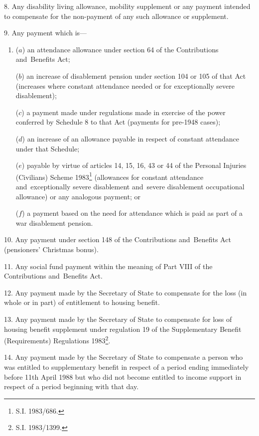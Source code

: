 \documentclass[12pt,a4paper]{article}
\begin{document}
8.  Any disability living allowance, mobility supplement or any payment intended to compensate for the non-payment of any such allowance or supplement.

\medskip

9.  Any payment which is—
\begin{enumerate}\item[]
($a$) an attendance allowance under section 64 of the Contributions and~Benefits Act;

($b$) an increase of disablement pension under section 104 or 105 of that Act (increases where constant attendance needed or for exceptionally severe disablement);

($c$) a payment made under regulations made in exercise of the power conferred by Schedule 8 to that Act (payments for pre-1948 cases);

($d$) an increase of an allowance payable in respect of constant attendance under that Schedule;

($e$) payable by virtue of articles 14, 15, 16, 43 or 44 of the Personal Injuries (Civilians) Scheme 1983\footnote{\frenchspacing S.I. 1983/686.} (allowances for constant attendance and~exceptionally severe disablement and~severe disablement occupational allowance) or any analogous payment; or

($f$) a payment based on the need for attendance which is paid as part of a war disablement pension.
\end{enumerate}

\medskip

10.  Any payment under section 148 of the Contributions and~Benefits Act (pensioners' Christmas bonus).

\medskip

11.  Any social fund payment within the meaning of Part VIII of the Contributions and~Benefits Act.

\medskip

12.  Any payment made by the Secretary of State to compensate for the loss (in whole or in part) of entitlement to housing benefit.

\medskip

13.  Any payment made by the Secretary of State to compensate for loss of housing benefit supplement under regulation 19 of the Supplementary Benefit (Requirements) Regulations 1983\footnote{\frenchspacing S.I. 1983/1399.}.

\medskip

14.  Any payment made by the Secretary of State to compensate a person who was entitled to supplementary benefit in respect of a period ending immediately before 11th April 1988 but who did not become entitled to income support in respect of a period beginning with that day.
\end{document}
